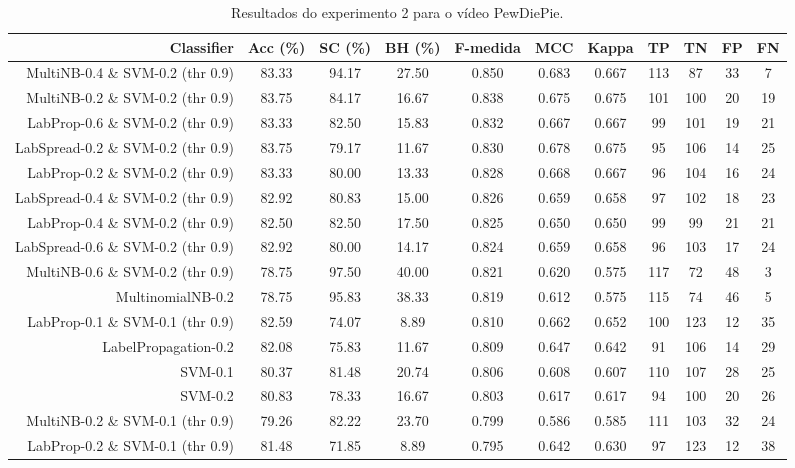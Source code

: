 \begin{table}[!htb]
\centering
\caption{Resultados do experimento 2 para o vídeo PewDiePie.}
\label{tab:PewDiePie}
\begin{tabular}{r|c|c|c|c|c|c|c|c|c|c}
\hline\hline
Classifier & Acc (\%) & SC (\%) & BH (\%) & F-medida & MCC & Kappa & TP & TN & FP & FN \\ \hline
MultiNB-0.4 \& SVM-0.2 (thr 0.9) & 83.33 & 94.17 & 27.50 & 0.850 & 0.683 & 0.667 & 113 & 87 & 33 & 7 \\ 
MultiNB-0.2 \& SVM-0.2 (thr 0.9) & 83.75 & 84.17 & 16.67 & 0.838 & 0.675 & 0.675 & 101 & 100 & 20 & 19 \\ 
LabProp-0.6 \& SVM-0.2 (thr 0.9) & 83.33 & 82.50 & 15.83 & 0.832 & 0.667 & 0.667 & 99 & 101 & 19 & 21 \\ 
LabSpread-0.2 \& SVM-0.2 (thr 0.9) & 83.75 & 79.17 & 11.67 & 0.830 & 0.678 & 0.675 & 95 & 106 & 14 & 25 \\ 
LabProp-0.2 \& SVM-0.2 (thr 0.9) & 83.33 & 80.00 & 13.33 & 0.828 & 0.668 & 0.667 & 96 & 104 & 16 & 24 \\ 
LabSpread-0.4 \& SVM-0.2 (thr 0.9) & 82.92 & 80.83 & 15.00 & 0.826 & 0.659 & 0.658 & 97 & 102 & 18 & 23 \\ 
LabProp-0.4 \& SVM-0.2 (thr 0.9) & 82.50 & 82.50 & 17.50 & 0.825 & 0.650 & 0.650 & 99 & 99 & 21 & 21 \\ 
LabSpread-0.6 \& SVM-0.2 (thr 0.9) & 82.92 & 80.00 & 14.17 & 0.824 & 0.659 & 0.658 & 96 & 103 & 17 & 24 \\ 
MultiNB-0.6 \& SVM-0.2 (thr 0.9) & 78.75 & 97.50 & 40.00 & 0.821 & 0.620 & 0.575 & 117 & 72 & 48 & 3 \\ 
MultinomialNB-0.2 & 78.75 & 95.83 & 38.33 & 0.819 & 0.612 & 0.575 & 115 & 74 & 46 & 5 \\ 
LabProp-0.1 \& SVM-0.1 (thr 0.9) & 82.59 & 74.07 & 8.89 & 0.810 & 0.662 & 0.652 & 100 & 123 & 12 & 35 \\ 
LabelPropagation-0.2 & 82.08 & 75.83 & 11.67 & 0.809 & 0.647 & 0.642 & 91 & 106 & 14 & 29 \\ 
SVM-0.1 & 80.37 & 81.48 & 20.74 & 0.806 & 0.608 & 0.607 & 110 & 107 & 28 & 25 \\ 
SVM-0.2 & 80.83 & 78.33 & 16.67 & 0.803 & 0.617 & 0.617 & 94 & 100 & 20 & 26 \\ 
MultiNB-0.2 \& SVM-0.1 (thr 0.9) & 79.26 & 82.22 & 23.70 & 0.799 & 0.586 & 0.585 & 111 & 103 & 32 & 24 \\ 
LabProp-0.2 \& SVM-0.1 (thr 0.9) & 81.48 & 71.85 & 8.89 & 0.795 & 0.642 & 0.630 & 97 & 123 & 12 & 38 \\ 

\end{tabular}
\end{table}
